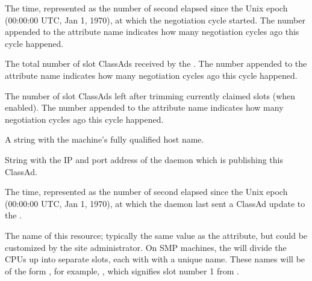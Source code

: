\begin{description}
\label{attr:LastNegotiationCycleTime<X>}
\item[\AdAttr{LastNegotiationCycleTime<X>}:] 
The time, represented as the number of second elapsed since the Unix
epoch (00:00:00 UTC, Jan 1, 1970), at which the negotiation cycle started.
The number  appended to the attribute name
indicates how many negotiation cycles ago this cycle happened.

\label{attr:LastNegotiationCycleTotalSlots<X>}
\item[\AdAttr{LastNegotiationCycleTotalSlots<X>}:] 
The total number of slot ClassAds received by the .
The number  appended to the attribute name indicates 
how many negotiation cycles ago this cycle happened.

\label{attr:LastNegotiationCycleTrimmedSlots<X>}
\item[\AdAttr{LastNegotiationCycleTrimmedSlots<X>}:] 
The number of slot ClassAds left after trimming currently claimed slots 
(when enabled).
The number  appended to the attribute name indicates 
how many negotiation cycles ago this cycle happened.

\item[\AdAttr{Machine}:] A string with the machine's fully qualified 
host name.

\item[\AdAttr{MyAddress}:] String with the IP and port address of the
 daemon which is publishing this ClassAd.

\item[\AdAttr{MyCurrentTime}:]  The time, represented as the number of 
second elapsed since the Unix epoch (00:00:00 UTC, Jan 1, 1970),
at which the  daemon last sent a ClassAd update to the
.

\item[\AdAttr{Name}:] The name of this resource; typically the same value as
the  attribute, but could be customized by the site
administrator.
On SMP machines, the  will divide the CPUs up into separate
slots, each with with a unique name.
These names will be of the form , for example,
, which signifies slot number 1 from
.


\end{description}
